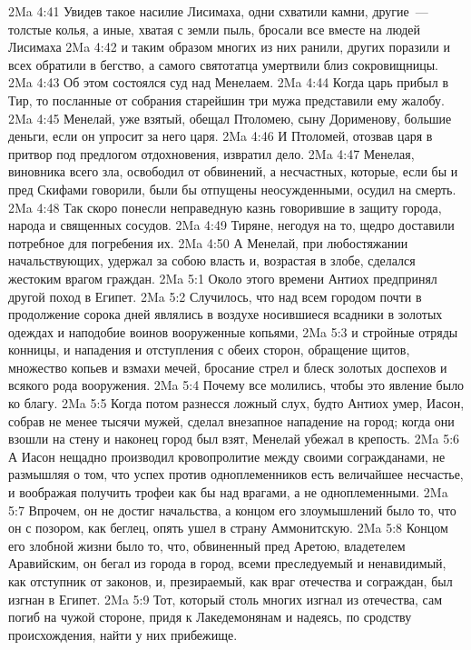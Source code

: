 \vs 2Ma 4:41 Увидев такое насилие Лисимаха, одни схватили камни, другие~--- толстые колья, а иные, хватая с земли пыль, бросали все вместе на людей Лисимаха
\vs 2Ma 4:42 и таким образом многих из них ранили, других поразили и всех обратили в бегство, а самого святотатца умертвили близ сокровищницы.
\vs 2Ma 4:43 Об этом состоялся суд над Менелаем.
\vs 2Ma 4:44 Когда царь прибыл в Тир, то посланные от собрания старейшин три мужа представили ему жалобу.
\vs 2Ma 4:45 Менелай, уже взятый, обещал Птоломею, сыну Дорименову, большие деньги, если он упросит за него царя.
\vs 2Ma 4:46 И Птоломей, отозвав царя в притвор под предлогом отдохновения, извратил дело.
\vs 2Ma 4:47 Менелая, виновника всего зла, освободил от обвинений, а несчастных, которые, если бы и пред Скифами говорили, были бы отпущены неосужденными, осудил на смерть.
\vs 2Ma 4:48 Так скоро понесли неправедную казнь говорившие в защиту города, народа и священных сосудов.
\vs 2Ma 4:49 Тиряне, негодуя на то, щедро доставили потребное для погребения их.
\vs 2Ma 4:50 А Менелай, при любостяжании начальствующих, удержал за собою власть и, возрастая в злобе, сделался жестоким врагом граждан.
\vs 2Ma 5:1 Около этого времени Антиох предпринял другой поход в Египет.
\vs 2Ma 5:2 Случилось, что над всем городом почти в продолжение сорока дней являлись в воздухе носившиеся всадники в золотых одеждах и наподобие воинов вооруженные копьями,
\vs 2Ma 5:3 и стройные отряды конницы, и нападения и отступления с обеих сторон, обращение щитов, множество копьев и взмахи мечей, бросание стрел и блеск золотых доспехов и всякого рода вооружения.
\vs 2Ma 5:4 Почему все молились, чтобы это явление было ко благу.
\rsbpar\vs 2Ma 5:5 Когда потом разнесся ложный слух, будто Антиох умер, Иасон, собрав не менее тысячи мужей, сделал внезапное нападение на город; когда они взошли на стену и наконец город был взят, Менелай убежал в крепость.
\vs 2Ma 5:6 А Иасон нещадно производил кровопролитие между своими согражданами, не размышляя о том, что успех против одноплеменников есть величайшее несчастье, и воображая получить трофеи как бы над врагами, а не одноплеменными.
\vs 2Ma 5:7 Впрочем, он не достиг начальства, а концом его злоумышлений было то, что он с позором, как беглец, опять ушел в страну Аммонитскую.
\vs 2Ma 5:8 Концом его злобной жизни было то, что, обвиненный пред Аретою, владетелем Аравийским, он бегал из города в город, всеми преследуемый и ненавидимый, как отступник от законов, и, презираемый, как враг отечества и сограждан, был изгнан в Египет.
\vs 2Ma 5:9 Тот, который столь многих изгнал из отечества, сам погиб на чужой стороне, придя к Лакедемонянам и надеясь, по сродству происхождения, найти у них прибежище.
